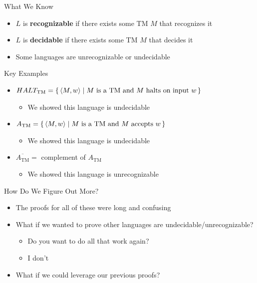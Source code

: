 \documentclass[aspectratio=169]{beamer}
\begin{document}
\begin{frame}{What We Know}
    \begin{itemize}
        \item $L$ is \textbf{recognizable} if there exists some TM $M$ that recognizes it \pause
        \item $L$ is \textbf{decidable} if there exists some TM $M$ that decides it \pause
        \item Some languages are unrecognizable or undecidable
    \end{itemize}
\end{frame}

\begin{frame}{Key Examples}
    \begin{itemize}
        \item $HALT_{\text{TM}} = \set{\langle M, w \rangle | \text{$M$ is a TM and $M$ halts on input $w$}}$
        \begin{itemize}
            \item We showed this language is undecidable \pause
        \end{itemize}
        \item $A_{\text{TM}} = \set{\langle M, w \rangle | \text{$M$ is a TM and $M$ accepts $w$}}$ 
        \begin{itemize}
            \item We showed this language is undecidable \pause
        \end{itemize}
        \item $\overline{A_{\text{TM}}} =$ complement of $A_{\text{TM}}$
        \begin{itemize}
            \item We showed this language is unrecognizable
        \end{itemize}
    \end{itemize}
\end{frame}

\begin{frame}{How Do We Figure Out More?}
    \begin{itemize}
        \item The proofs for all of these were long and confusing \pause
        \item What if we wanted to prove other languages are undecidable/unrecognizable? \pause
        \begin{itemize}
            \item Do you want to do all that work again? 
            \item I don't \pause
        \end{itemize}
        \item What if we could leverage our previous proofs?
    \end{itemize}
\end{frame}
\end{document}
